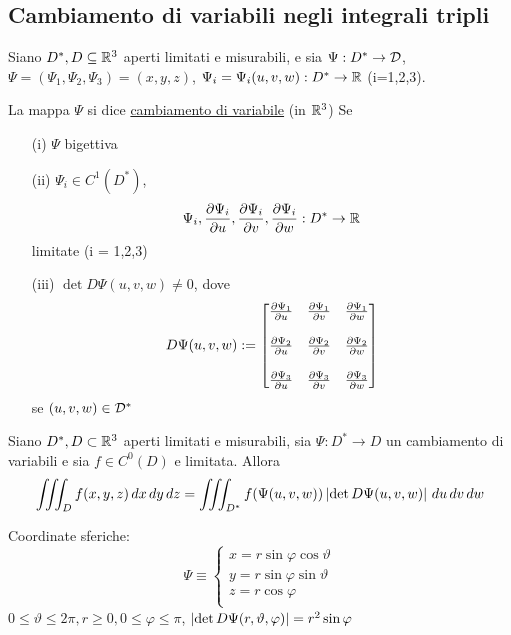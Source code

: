 \subsection{Cambiamento di variabili negli integrali tripli}
Siano $D^*, D \subseteq \mathbb{R}^3$ aperti limitati e misurabili, e sia 
$\Psi : D^* \to \mathcal{D}$, $\Psi = (\Psi_1, \Psi_2, \Psi_3) = (x,y,z)$, 
$\Psi_i = \Psi_i(u,v,w):D^*\to\mathbb{R}$ (i=1,2,3).
\begin{definition}
  La mappa $\Psi$ si dice \underline{cambiamento di variabile} (in $\mathbb{R}^3$) Se
  \begin{itemize}
    \item[(i)] $\Psi$ \ace bigettiva
    \item[(ii)] $\Psi_i \in C^1(D^*)$, 
                $$\Psi_i, \frac{\partial \Psi_i}{\partial u}, \frac{\partial \Psi_i}{\partial v}, \frac{\partial \Psi_i}{\partial w} : D^* \to \mathbb{R}$$
                limitate (i = 1,2,3) 
    \item[(iii)] $\det D\Psi(u,v,w) \neq 0$, dove 
                $$D\Psi(u,v,w) := \begin{bmatrix}
                  \frac{\partial \Psi_1}{\partial u} & \frac{\partial \Psi_1}{\partial v} & \frac{\partial \Psi_1}{\partial w} \\
                  \\
                  \frac{\partial \Psi_2}{\partial u} & \frac{\partial \Psi_2}{\partial v} & \frac{\partial \Psi_2}{\partial w} \\
                  \\
                  \frac{\partial \Psi_3}{\partial u} & \frac{\partial \Psi_3}{\partial v} & \frac{\partial \Psi_3}{\partial w} \\
                \end{bmatrix}$$
                se $(u,v,w)\in\mathcal{D}^*$
  \end{itemize}
\end{definition}
\begin{theorem}
  Siano $D^*, D \subset \mathbb{R}^3$ aperti limitati e misurabili, sia 
  $\Psi : D^* \to D$ un cambiamento di variabili e sia $f \in C^0(D)$ e limitata.
  Allora 
  $$\iiint_{D} f(x,y,z) \,dx\,dy\,dz = \iiint_{D^*} f(\Psi(u,v,w)) \left\lvert \det D\Psi(u,v,w) \right\rvert \,du\,dv\,dw$$
\end{theorem}
\begin{definition}
  Coordinate sferiche:
  $$\Psi \equiv \left\{\begin{array}{l}
    x = r \sin\varphi\cos\vartheta \\
    y = r \sin\varphi\sin\vartheta \\
    z = r \cos\varphi \\
  \end{array}\right.$$
  $0 \leq \vartheta\leq 2\pi, r\geq 0, 0 \leq \varphi \leq \pi$, 
  $\left\lvert \det D\Psi(r,\vartheta,\varphi) \right\rvert = r^2 \sin\varphi$
\end{definition}